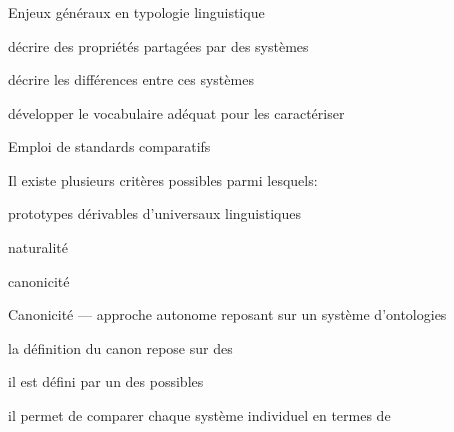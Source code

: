\begin{frame}
\frametitle{}
\begin{wideitemize}
\item {Enjeux généraux en typologie linguistique}
\begin{smallwideitemize}
  \item {décrire des propriétés partagées par des systèmes}
  \item {décrire les différences entre ces systèmes}
  \item {développer le vocabulaire adéquat pour les caractériser}
\end{smallwideitemize}
\item {Emploi de standards comparatifs}
\begin{smallwideitemize}
\item {Il existe plusieurs critères possibles parmi lesquels:}
\begin{smallwideitemize}
  \item {prototypes dérivables d'universaux linguistiques \cite{greenberg63}}
  \item {naturalité \cite{wurzel84,dressler00}}
  \item {canonicité \cite{corbett03,corbett07b}}
\end{smallwideitemize}
\end{smallwideitemize}
\pause
\item Canonicité {\small --- approche autonome reposant sur un système
    d'ontologies}
\begin{smallwideitemize}
  \item la définition du canon repose sur des 
  \item il est défini par un  des possibles
  \item il permet de comparer chaque système individuel en
    termes de 
\end{smallwideitemize}
\end{wideitemize}
\end{frame}